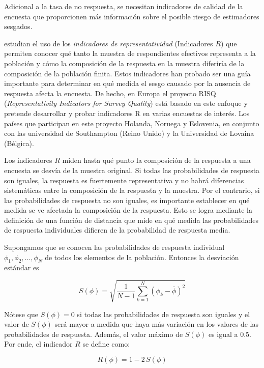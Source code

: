 \documentclass[
  12pt,
]{book}
\begin{document}
Adicional a la tasa de no respuesta, se necesitan indicadores
de calidad de la encuesta que proporcionen más información sobre el
posible riesgo de estimadores sesgados.

\citet{Shlomo_Skinner_Schouten_2012} estudian el uso de los \emph{indicadores de representatividad} (Indicadores \(R\)) que permiten conocer qué tanto la muestra de respondientes efectivos representa a la población y cómo la composición de la respuesta en la muestra diferiría de la composición de la población finita. Estos indicadores han probado ser una guía importante para determinar en qué medida el sesgo causado por la ausencia de respuesta afecta la encuesta. De hecho, en Europa el proyecto RISQ (\emph{Representativity Indicators for Survey Quality}) está basado en este enfoque y pretende desarrollar y probar indicadores R en varias encuestas de interés. Los países que participan en este proyecto Holanda, Noruega y Eslovenia, en conjunto con las universidad de Southampton (Reino Unido) y la Universidad de Lovaina (Bélgica).

Los indicadores \(R\) miden hasta qué punto la composición de
la respuesta a una encuesta se desvía de la muestra original. Si todas las probabilidades de respuesta son iguales, la respuesta
es fuertemente representativa y no habrá diferencias sistemáticas
entre la composición de la respuesta y la muestra. Por el contrario, si las probabilidades de respuesta no son iguales, es importante
establecer en qué medida se ve afectada la composición de la respuesta. Esto se logra mediante la definición de una función de distancia
que mide en qué medida las probabilidades de respuesta individuales
difieren de la probabilidad de respuesta media.

Supongamos que se conocen las probabilidades de respuesta individual
\(\phi_{1},\phi_{2},\ldots,\phi_{N}\) de todos los elementos de la población.
Entonces la desviación estándar es

\[
S\left(\phi\right)  =  \sqrt{\frac{1}{N-1}\sum_{k=1}^{N}\left(\phi_{k}-\bar{\phi}\right)^{2}}
\]

Nótese que \(S\left(\phi\right)=0\) si todas las probabilidades de respuesta
son iguales y el valor de \(S\left(\phi\right)\) será mayor a medida
que haya más variación en los valores de las probabilidades de respuesta. Además, el valor máximo de \(S\left(\phi\right)\) es igual a 0.5. Por ende, el indicador \(R\) se define como:

\[
R\left(\phi\right)=1-2\,S\left(\phi\right)
\]
\end{document}
